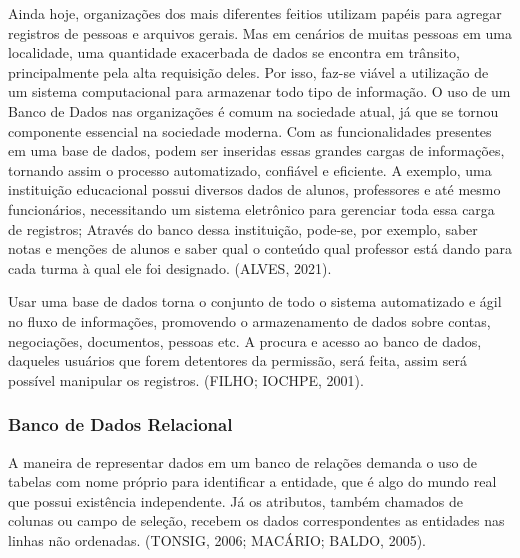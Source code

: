 \documentclass[a4paper,12pt]{article}
\begin{document}
Ainda hoje, organizações dos mais diferentes feitios utilizam papéis para agregar registros de pessoas e arquivos gerais. Mas em cenários
de muitas pessoas em uma localidade, uma quantidade exacerbada de dados se encontra em trânsito, principalmente pela alta requisição deles. 
Por isso, faz-se viável a utilização de um sistema computacional para armazenar todo tipo de informação. O uso de um Banco de Dados nas 
organizações é comum na sociedade atual, já que se tornou componente essencial na sociedade moderna. Com as funcionalidades presentes em 
uma base de dados, podem ser inseridas essas grandes cargas de informações, tornando assim o processo automatizado, confiável e eficiente. 
A exemplo, uma instituição educacional possui diversos dados de alunos, professores e até mesmo funcionários, necessitando um sistema 
eletrônico para gerenciar toda essa carga de registros; Através do banco dessa instituição, pode-se, por exemplo, saber notas e menções 
de alunos e saber qual o conteúdo qual professor está dando para cada turma à qual ele foi designado. (ALVES, 2021).

Usar uma base de dados torna o conjunto de todo o sistema automatizado e ágil no fluxo de informações, promovendo o armazenamento 
de dados sobre contas, negociações, documentos, pessoas etc. A procura e acesso ao banco de dados, daqueles usuários que forem detentores 
da permissão, será feita, assim será possível manipular os registros. (FILHO; IOCHPE, 2001).

\subsubsection{Banco de Dados Relacional}
A maneira de representar dados em um banco de relações demanda o uso de tabelas com nome próprio para identificar a entidade, que é 
algo do mundo real que possui existência independente. Já os atributos, também chamados de colunas ou campo de seleção, recebem os 
dados correspondentes as entidades nas linhas não ordenadas. (TONSIG, 2006; MACÁRIO; BALDO, 2005). 
\end{document}
